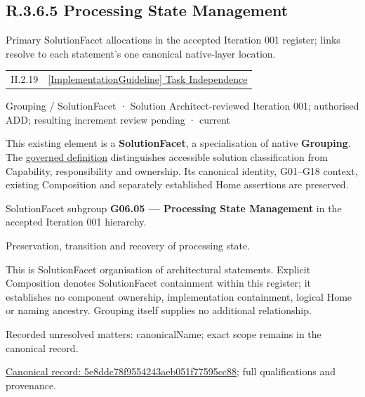 \subsection*{R.3.6.5 Processing State Management}
\label{navigation:R.3.6.5}

Primary SolutionFacet allocations in the accepted Iteration 001 register; links resolve to each statement’s one canonical native-layer location.\par
\begin{longtable}{p{.22\linewidth}p{.73\linewidth}}
II.2.19 & \hyperref[element:80fe052799944843917044749288f297]{[ImplementationGuideline] Task Independence} \\
\end{longtable}
\label{element:5e8ddc78f9554243aeb051f77595cc88}
{\small Grouping / SolutionFacet · Solution Architect-reviewed Iteration 001; authorised ADD; resulting increment review pending · current}\par

This existing element is a \textbf{SolutionFacet}, a specialisation of native
\textbf{Grouping}. The \href{\detokenize{../../../../../../../governance/continuum-representation.md#solutionfacet-classification--1119-candidate}}{governed definition}
distinguishes accessible solution classification from Capability, responsibility
and ownership. Its canonical identity, G01–G18 context, existing Composition
and separately established Home assertions are preserved.



SolutionFacet subgroup \textbf{G06.05 — Processing State Management} in the accepted Iteration 001 hierarchy.



Preservation, transition and recovery of processing state.



This is SolutionFacet organisation of architectural statements. Explicit Composition denotes SolutionFacet containment within this register; it establishes no component ownership, implementation containment, logical Home or naming ancestry. Grouping itself supplies no additional relationship.


{\small Recorded unresolved matters: canonicalName; exact scope remains in the canonical record.}\par
{\footnotesize \href{../../../../../../../continuum/grouping/5e8ddc78f9554243aeb051f77595cc88.md}{Canonical record: 5e8ddc78f9554243aeb051f77595cc88}; full qualifications and provenance.}\par
